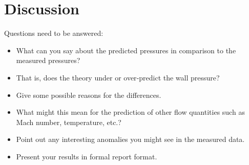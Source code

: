 \chapter{Discussion}
\label{cp:discussion}

Questions need to be answered:

\begin{itemize}
  \item What can you say about the predicted pressures in comparison to the measured pressures?
  \item That is, does the theory under or over‐predict the wall pressure?
  \item Give some possible reasons for the differences.
  \item What might this mean for the prediction of other flow quantities such as Mach number, temperature, etc.?
  \item Point out any interesting anomalies you might see in the measured data.
  \item Present your results in formal report format.
\end{itemize}
  